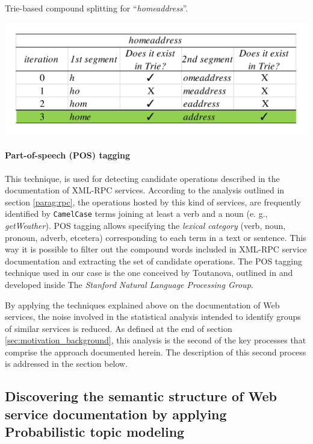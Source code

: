 \begin{table}
\caption{Trie-based compound splitting for \textquotedblleft{}\emph{homeaddress}\textquotedblright{}.}


\center\includegraphics[scale=0.5]{images/example-trie-spellchecking-en}\label{trie-example}
\end{table}



\paragraph{Part-of-speech (POS) tagging}
\label{parag:part-of-speech}
This technique, is used for detecting candidate operations described in the documentation of XML-RPC services. According to the analysis outlined in section \ref{parag:rpc}, the operations hosted by this kind of services, are frequently identified by \texttt{CamelCase} terms joining at least a verb and a noun (e. g., \emph{getWeather}). POS tagging allows specifying the \emph{lexical category} (verb, noun, pronoun, adverb, etcetera) corresponding to each term in a text or sentence. This way it is possible to filter out the compound words included in XML-RPC service documentation and extracting the set of candidate operations. The POS tagging technique used in our case is the one conceived by Toutanova, outlined in \cite{Toutanova:2003} and developed inside The \emph{Stanford Natural Language Processing Group}.

By applying the techniques explained above on the documentation of Web services, the noise involved in the statistical analysis intended
to identify groups of similar services is reduced. As defined at the end of section \ref{sec:motivation_background}, this analysis is the second of the key processes that comprise the approach documented herein. The description of this second process is addressed in the section below.

\subsection{Discovering the semantic structure of Web service documentation by applying Probabilistic topic modeling}
\label{subsec:probabilistic-topic-models}

